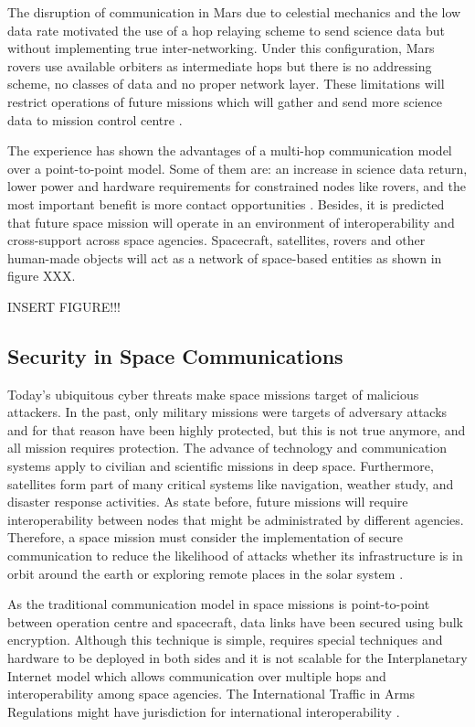 The disruption of communication in Mars due to celestial mechanics and the low data rate motivated the use of a hop relaying scheme to send science data but without implementing true inter-networking. Under this configuration, Mars rovers use available orbiters as intermediate hops but there is no addressing scheme, no classes of data and no proper network layer. These limitations will restrict operations of future missions which will gather and send more science data to mission control centre  \cite{rationale2010requirements}. 

The experience has shown the advantages of a multi-hop communication model over a point-to-point model. Some of them are: an increase in science data return, lower power and hardware requirements for constrained nodes like rovers,  and the most important benefit is more contact opportunities \cite{rationale2010requirements}. Besides, it is predicted that future space mission will operate in an environment of interoperability and cross-support across space agencies. Spacecraft, satellites, rovers and other human-made objects will act as a network of space-based entities as shown in figure XXX.

INSERT FIGURE!!!


\subsection{Security in Space Communications}



Today's ubiquitous cyber threats make space missions target of malicious attackers.  In the past, only military missions were targets of adversary attacks and for that reason have been highly protected, but this is not true anymore, and all mission requires protection. The advance of technology and communication systems apply to civilian and scientific missions in deep space. Furthermore, satellites form part of many critical systems like navigation, weather study, and disaster response activities.  As state before, future missions will require interoperability between nodes that might be administrated by different agencies. Therefore, a space mission must consider the implementation of secure communication to reduce the likelihood of attacks whether its infrastructure is in orbit around the earth or exploring remote places in the solar system \cite{book2006security}.

As the traditional communication model in space missions is point-to-point between operation centre and spacecraft, data links have been secured using bulk encryption. Although this technique is simple, requires special techniques and hardware to be deployed in both sides and it is not scalable for the Interplanetary Internet model which allows communication over multiple hops and interoperability among space agencies. The International Traffic in Arms Regulations might have jurisdiction for international interoperability \cite{ivancic2009security}. 

